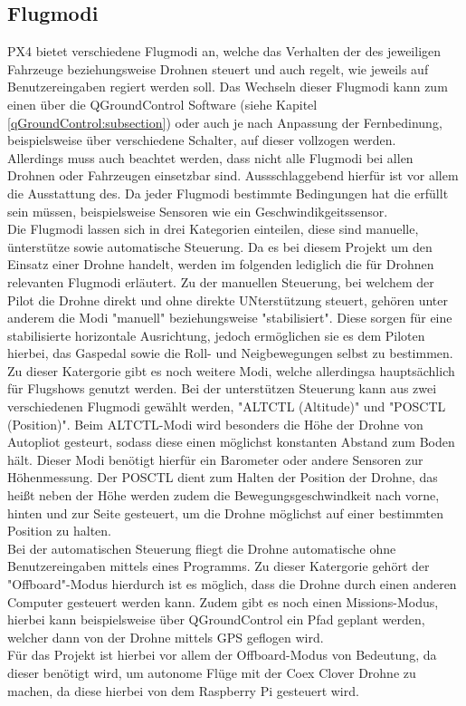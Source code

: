 \subsection{Flugmodi}
PX4 bietet verschiedene Flugmodi an, welche das Verhalten der des jeweiligen Fahrzeuge beziehungsweise Drohnen steuert und auch regelt, wie jeweils auf Benutzereingaben regiert werden soll. Das Wechseln dieser Flugmodi kann zum einen über die QGroundControl Software (siehe Kapitel \ref{qGroundControl:subsection}) oder auch je nach Anpassung der Fernbedinung, beispielsweise über verschiedene Schalter, auf dieser vollzogen werden. \\
Allerdings muss auch beachtet werden, dass nicht alle Flugmodi bei allen Drohnen oder Fahrzeugen einsetzbar sind. Aussschlaggebend hierfür ist vor allem die Ausstattung des. Da jeder Flugmodi bestimmte Bedingungen hat die erfüllt sein müssen, beispielsweise Sensoren wie ein Geschwindikgeitssensor. \\
Die Flugmodi lassen sich in drei Kategorien einteilen, diese sind manuelle, ünterstütze sowie automatische Steuerung.
Da es bei diesem Projekt um den Einsatz einer Drohne handelt, werden im folgenden lediglich die für Drohnen relevanten Flugmodi erläutert.
Zu der manuellen Steuerung, bei welchem der Pilot die Drohne direkt und ohne direkte UNterstützung steuert, gehören unter anderem die Modi "manuell" beziehungsweise "stabilisiert". Diese sorgen für eine stabilisierte horizontale Ausrichtung, jedoch ermöglichen sie es dem Piloten hierbei, das Gaspedal sowie die Roll- und Neigbewegungen selbst zu bestimmen. Zu dieser Katergorie gibt es noch weitere Modi, welche allerdingsa hauptsächlich für Flugshows genutzt werden.
Bei der unterstützen Steuerung kann aus zwei verschiedenen Flugmodi gewählt werden, "ALTCTL (Altitude)" und "POSCTL (Position)". Beim ALTCTL-Modi wird besonders die Höhe der Drohne von Autopliot gesteurt, sodass diese einen möglichst konstanten Abstand zum Boden hält. Dieser Modi benötigt hierfür ein Barometer oder andere Sensoren zur Höhenmessung.
Der POSCTL dient zum Halten der Position der Drohne, das heißt neben der Höhe werden zudem die Bewegungsgeschwindkeit nach vorne, hinten und zur Seite gesteuert, um die Drohne möglichst auf einer bestimmten Position zu halten.\\
Bei der automatischen Steuerung fliegt die Drohne automatische ohne Benutzereingaben mittels eines Programms. Zu dieser Katergorie gehört der "Offboard"-Modus hierdurch ist es möglich, dass die Drohne durch einen anderen Computer gesteuert werden kann. Zudem gibt es noch einen Missions-Modus, hierbei kann beispielsweise über QGroundControl ein Pfad geplant werden, welcher dann von der Drohne mittels GPS geflogen wird. \\
Für das Projekt ist hierbei vor allem der Offboard-Modus von Bedeutung, da dieser benötigt wird, um autonome Flüge mit der Coex Clover Drohne zu machen, da diese hierbei von dem Raspberry Pi gesteuert wird. \cite[vgl.][]{flight-modes}


